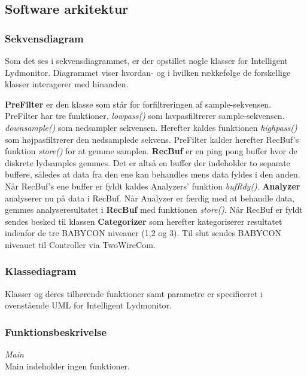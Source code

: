 \newpage
\subsection{Software arkitektur}
\subsubsection*{Sekvensdiagram}

Som det ses i sekvensdiagrammet, er der opstillet nogle klasser for Intelligent Lydmonitor. Diagrammet viser hvordan- og i hvilken rækkefølge de forskellige klasser interagerer med hinanden. 

\textbf{PreFilter} er den klasse som står for forfiltreringen af sample-sekvensen. PreFilter har tre funktioner, \textit{lowpass()} som lavpasfiltrerer sample-sekvensen. \textit{downsample()} som nedsampler sekvensen. Herefter kaldes funktionen \textit{highpass()} som højpasfiltrerer den nedsamplede sekvens. PreFilter kalder herefter RecBuf's funktion \textit{store()} for at gemme samplen.
\textbf{RecBuf} er en ping pong buffer hvor de diskrete lydsamples gemmes. Det er altså en buffer der indeholder to separate buffere, således at data fra den ene kan behandles mens data fyldes i den anden. Når RecBuf's ene buffer er fyldt kaldes Analyzers' funktion \textit{bufRdy()}. \textbf{Analyzer} analyserer nu på data i RecBuf. Når Analyzer er færdig med at behandle data, gemmes analyseresultatet i \textbf{RecBuf} med funktionen \textit{store()}. Når RecBuf er fyldt sendes besked til klassen \textbf{Categorizer} som herefter kategoriserer resultatet indenfor de tre BABYCON niveauer (1,2 og 3). 
Til slut sendes BABYCON niveauet til Controller via TwoWireCom. 

\subsubsection*{Klassediagram}
Klasser og deres tilhørende funktioner samt parametre er specificeret i ovenstående UML for Intelligent Lydmonitor. 

\subsubsection*{Funktionsbeskrivelse}
\textit{Main} \\
Main indeholder ingen funktioner.

